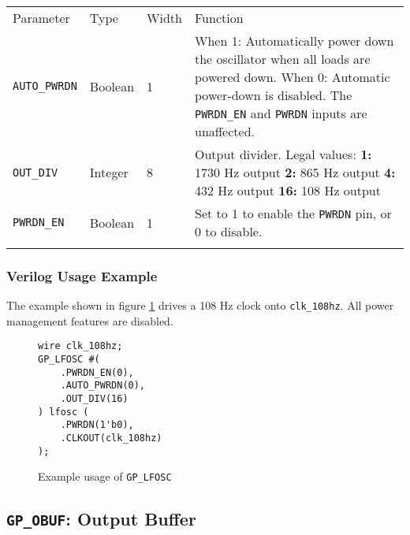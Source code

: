 \documentclass[11pt]{article}
\newcommand{\tokenstyle}[1]{\texttt{#1}}
\newcommand{\wirestyle}[1]{\texttt{#1}}
\newcommand{\whenstyle}[1]{{\fontseries{sb}\selectfont#1}}
\newcommand{\thinhline}{\Xhline{1\arrayrulewidth}}
\newcommand{\thickhline}{\Xhline{2.5\arrayrulewidth}}
\begin{document}
\begin{tabularx}{\textwidth}{lllX}
\thinhline
\whenstyle{Parameter} & \whenstyle{Type} & \whenstyle{Width} & \whenstyle{Function} \\
\thickhline
\tokenstyle{AUTO\_PWRDN} & Boolean & 1 &
	\whenstyle{When 1:} Automatically power down the oscillator when all loads are powered down. \newline
	\whenstyle{When 0:} Automatic power-down is disabled. The \tokenstyle{PWRDN\_EN} and \tokenstyle{PWRDN} inputs are unaffected.\\
\thinhline
\tokenstyle{OUT\_DIV} & Integer & 8 &
	Output divider. Legal values: \newline
	\textbf{1:} 1730 Hz output \newline
	\textbf{2:} 865 Hz output \newline
	\textbf{4:} 432 Hz output \newline
	\textbf{16:} 108 Hz output
\\
\thinhline
\tokenstyle{PWRDN\_EN} & Boolean & 1 & Set to 1 to enable the \tokenstyle{PWRDN} pin, or 0 to disable. \\
\thinhline
\end{tabularx}

\subsubsection{Verilog Usage Example}

The example shown in figure \ref{gp-lfosc-example} drives a 108 Hz clock onto \wirestyle{clk\_108hz}. All power management features
are disabled.

\begin{figure}[h]
\begin{lstlisting}
wire clk_108hz;
GP_LFOSC #(
	.PWRDN_EN(0),
	.AUTO_PWRDN(0),
	.OUT_DIV(16)
) lfosc (
	.PWRDN(1'b0),
	.CLKOUT(clk_108hz)
);
\end{lstlisting}
\caption{Example usage of \tokenstyle{GP\_LFOSC}}
\label{gp-lfosc-example}
\end{figure}


\pagebreak
\subsection{\tokenstyle{GP\_OBUF}: Output Buffer}
\label{gp-obuf}
\end{document}
